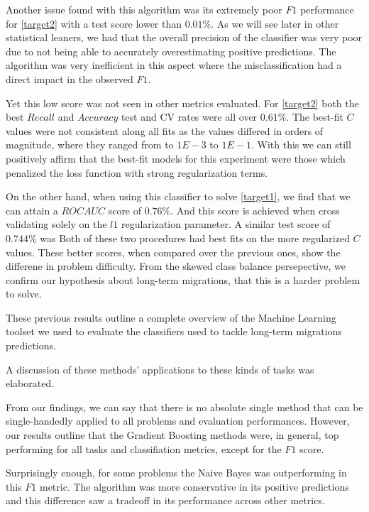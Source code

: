 Another issue found with this algorithm was its extremely poor $F1$ performance for \cref{target2} with a test score lower than $0.01\%$.
As we will see later in other statistical leaners, we had that 
the overall precision of the classifier was very poor due to not being able to accurately overestimating positive predictions.
The algorithm was very inefficient in this aspect where the misclassification had a direct impact in the observed $F1$. 


Yet this low score was not seen in other metrics evaluated. 
For \cref{target2} both the best $Recall$ and $Accuracy$ test and CV rates were all over $0.61\%$. 
The best-fit $C$ values were not consistent along all fits as the values differed in orders of magnitude, where they ranged from to $1E-3$ to $1E-1$.
With this we can still positively affirm that the best-fit models for this experiment were those which penalized the loss function with strong regularization terms.


On the other hand, when using this classifier to solve \cref{target1}, we find that we can attain a $ROC AUC$ score of $0.76\%$. 
And this score is achieved when cross validating solely on the $l1$ regularization parameter. 
A similar test score of $0.744\%$ was 
Both of these two procedures had best fits on the more regularized $C$values.
These better scores, when compared over the previous ones, show the differene in problem difficulty.
From the skewed class balance persepective, we confirm our hypothesis about long-term migrations, that this is a harder problem to solve.


These previous results outline a complete overview of the Machine Learning toolset we used to evaluate the classifiers
used to tackle long-term migrations predictions.






A discussion of these methods' applications to these kinds of tasks was elaborated.

From our findings, we can say that there is no absolute single method that can be single-handedly applied to all problems and evaluation performances. 
However, our results outline that the Gradient Boosting methods were, in general, top performing for all tasks and classifiation metrics, except for the $F1$ score.

Surprisingly enough, for some problems the Naive Bayes was outperforming in this $F1$ metric. 
The algorithm was more conservative in its positive predictions and this difference saw a tradeoff in its performance across other metrics.

